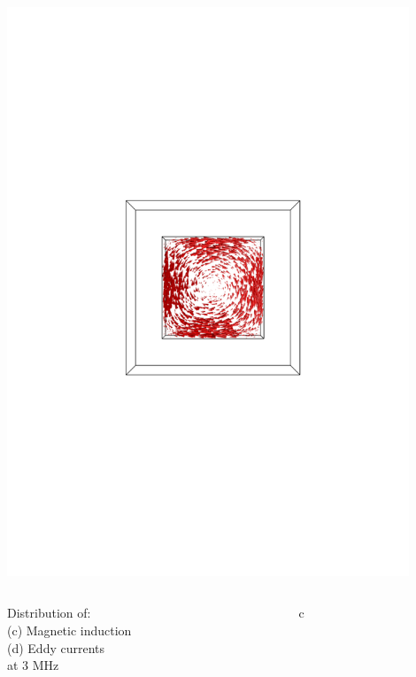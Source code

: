 \documentclass[compress]{beamer}
\begin{document}
\begin{frame}
\begin{columns}[totalwidth=\textwidth]
\begin{column}{.35\textwidth}
	\includegraphics[width=0.9\textwidth]{Graphic/04_B3cubeeddy300k_XYview.pdf}
	\end{column}
\end{columns}
\begin{columns}[totalwidth=\textwidth]
	\begin{column}{.30\textwidth}
	Distribution of: \\
	(c) Magnetic induction \\
	(d) Eddy currents \\
	at 3 MHz
	\end{column}
	\begin{column}{.35\textwidth}
	\centering
	c

\end{column}
\end{columns}
\end{frame}
\end{document}

